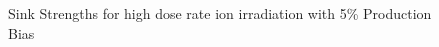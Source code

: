 \documentclass[a4paper]{article}
\begin{document}
      \begin{figure}[h!]  %
        \centering
        \qquad
        \caption{Sink Strengths for high dose rate ion irradiation with 5\% Production Bias}
        \label{figure:sink_strengths_ion_5_1e-3}
      \end{figure}
\end{document}
